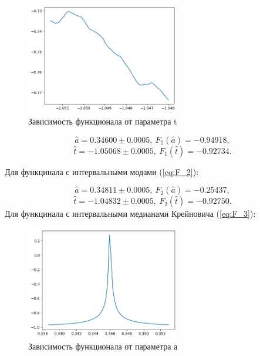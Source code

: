 \documentclass{article}
\begin{document}
  \begin{figure}[htbp!]
  \begin{center}
      \includegraphics[width = 0.6\textwidth]{t_simple}
      \caption{Зависимость функционала от параметра t}
  \label{figure:t_simple}
  \end{center}
  \end{figure}

  \[ \hat a = 0.34600 \pm 0.0005, \ F_1 (\hat a) = -0.94918, \]
  \[ \hat t = -1.05068 \pm 0.0005, \ F_1 (\hat t) = -0.92734. \]

  \newpage
  Для функцинала с интервальными модами (\ref{eq:F_2}):

  \[ \hat a = 0.34811 \pm 0.0005, \ F_2 (\hat a) = -0.25437, \]
  \[ \hat t = -1.04832 \pm 0.0005, \ F_2 (\hat t) = -0.92750. \]
  \newpage
  Для функцинала с интервальными медианами Крейновича (\ref{eq:F_3}):

  \begin{figure}[htbp!]
    \begin{center}
        \includegraphics[width = 0.6\textwidth]{a_med_k}
        \caption{Зависимость функционала от параметра а}
  \label{figure:a_med_k}
    \end{center}
  \end{figure}
\end{document}
